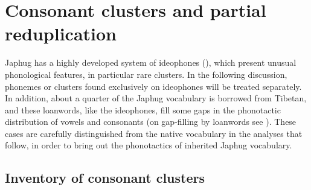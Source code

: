 \chapter{Consonant clusters and partial reduplication} \label{sec:clusters.redp}

  
 Japhug has a highly  developed system of ideophones (\citealt{japhug14ideophones}), which present unusual phonological features, in particular rare clusters. In the following discussion, phonemes or clusters found exclusively on  ideophones will be treated separately. In addition, about a quarter of the Japhug vocabulary is borrowed from Tibetan, and these loanwords, like the ideophones, fill some gaps in the phonotactic distribution of vowels and consonants (on gap-filling by loanwords see \citealt[63-64]{martinet05economie}).  These cases are carefully distinguished from the native vocabulary in the analyses that follow, in order to bring out the phonotactics of inherited Japhug vocabulary.


\section{Inventory of consonant clusters}



